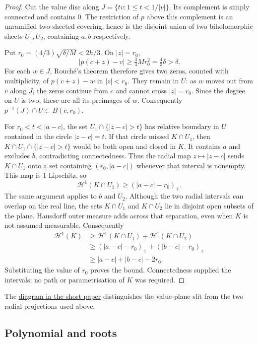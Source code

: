 \documentclass[11pt]{article}
\begin{document}
\begin{proof}
Cut the value disc along $J=\{tv:1\le t<1/|v|\}$. Its complement is simply
connected and contains $0$. The restriction of $p$ above this complement is
an unramified two-sheeted covering, hence is the disjoint union of two
biholomorphic sheets $U_1,U_2$, containing $a,b$ respectively.

Put $r_0=(4/3)\sqrt{\delta/M}<2h/3$. On $|z|=r_0$,
\[
 |p(c+z)-v|\ge\tfrac34Mr_0^2=\tfrac43\delta>\delta.
\]
For each $w\in J$, Rouch\'e's theorem therefore gives two zeros, counted
with multiplicity, of $p(c+z)-w$ in $|z|<r_0$. They remain in $U$: as $w$
moves out from $v$ along $J$, the zeros continue from $c$ and cannot cross
$|z|=r_0$. Since the degree on $U$ is two, these are all its preimages of
$w$. Consequently $p^{-1}(J)\cap U\subset B(c,r_0)$.

For $r_0<t<|a-c|$, the set $U_1\cap\{|z-c|>t\}$ has relative boundary
in $U$ contained in the circle $|z-c|=t$. If that circle missed $K\cap U_1$,
then $K\cap U_1\cap\{|z-c|>t\}$ would be both open and closed in $K$.
It contains $a$ and excludes $b$, contradicting connectedness. Thus the radial map $z\mapsto|z-c|$ sends
$K\cap U_1$ onto a set containing $(r_0,|a-c|)$ whenever that interval is
nonempty. This map is $1$-Lipschitz, so
\[
 \mathcal H^1(K\cap U_1)\ge (|a-c|-r_0)_+.
\]
The same argument applies to $b$ and $U_2$. Although the two radial
intervals can overlap on the real line, the sets $K\cap U_1$ and
$K\cap U_2$ lie in disjoint open subsets of the plane. Hausdorff outer
measure adds across that separation, even when $K$ is not assumed
measurable. Consequently
\begin{align*}
 \mathcal H^1(K)
 &\ge\mathcal H^1(K\cap U_1)+\mathcal H^1(K\cap U_2)\\
 &\ge(|a-c|-r_0)_+ + (|b-c|-r_0)_+\\
 &\ge |a-c|+|b-c|-2r_0.
\end{align*}
Substituting the value of $r_0$ proves the bound. Connectedness supplied
the intervals; no path or parametrisation of $K$ was required.
\end{proof}

The \href{erdos-1041-lemniscate-newton-flow.pdf\#bottleneck-geometry}
{diagram in the short paper} distinguishes the value-plane slit from
the two radial projections used above.

\subsection{Polynomial and roots}\label{subsec:counterexample-polynomial}
\end{document}
